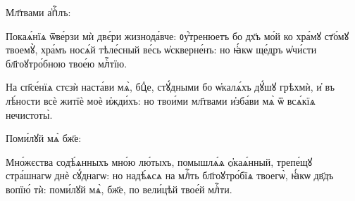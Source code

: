  Мл҃твами а҆пⷭ҇лъ:
\label{mytar} 
%

\hKv Покаѧ́нїѧ ѿве́рзи мѝ двє́ри  жизнода́вче: ᲂу҆́тренюетъ бо дх҃ъ мо́й ко хра́мꙋ ст҃о́мꙋ  твоемꙋ̀, хра́мъ носѧ́й тѣле́сный ве́сь ѡ҆скверне́нъ: но  ꙗ҆́кѡ ще́дръ ѡ҆чи́сти бл҃гоꙋтро́бною твое́ю млⷭ҇тїю. 
%

\hKv На сп҃се́нїѧ стєзѝ наста́ви мѧ̀,  бцⷣе, стꙋ́дными бо ѡ҆калѧ́хъ дꙋ́шꙋ грѣхмѝ, и҆ въ  лѣ́ности всѐ житїѐ моѐ и҆жди́хъ: но твои́ми мл҃твами  и҆зба́ви мѧ̀ ѿ всѧ́кїѧ нечистоты̀. 
%

\hKv Поми́лꙋй мѧ̀ бж҃е: 
%

\hKv Мно́жєства содѣ́ѧнныхъ мно́ю лю́тыхъ, помышлѧ́ѧ  ѻ҆каѧ́нный, трепе́щꙋ стра́шнагѡ днѐ сꙋ́днагѡ: но надѣ́ѧсѧ  на млⷭ҇ть бл҃гоꙋтро́бїѧ твоегѡ̀, ꙗ҆́кѡ дв҃дъ вопїю́ тѝ:  поми́лꙋй мѧ̀, бж҃е, по вели́цѣй твое́й млⷭ҇ти. 

